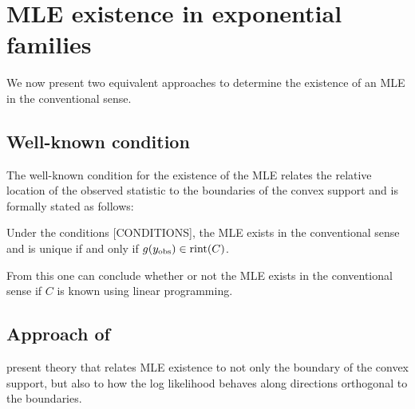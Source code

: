



\section{MLE existence in exponential families}
We now present two equivalent approaches to determine the existence of an MLE
in the conventional sense.  

\subsection{Well-known condition}
The well-known condition for the existence of the MLE \citep{Barndorff, Brown:1986} 
relates the relative location
of the observed statistic to the boundaries of the convex support
and is formally stated as follows:
\begin{theorem} \label{Thm:MLE rint}
Under the conditions [CONDITIONS], the MLE exists in the conventional sense and is 
unique if and only if 
$g(y_{\textrm{obs}}) \in \operatorname{rint}(C)$.
\end{theorem}

From this one can conclude whether or not the MLE exists in the conventional sense
if $C$ is known using linear programming.

\subsection{Approach of \citet{Geyer:gdor}}
\citet{Geyer:1990,Geyer:gdor} present theory that relates MLE existence to
 not only the boundary of the convex support, but also to how the log likelihood behaves along
directions orthogonal to the boundaries.

